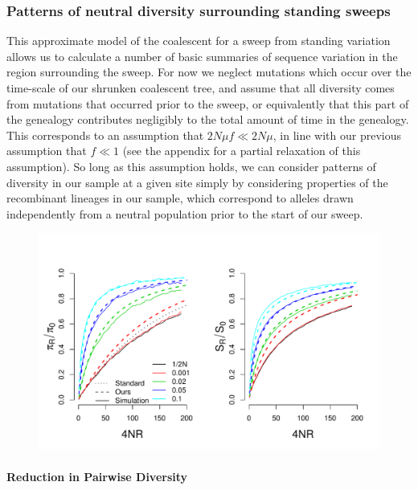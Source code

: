 \documentclass[a4paper,10pt]{article}
\begin{document}
\subsubsection*{Patterns of neutral diversity surrounding standing sweeps}
This approximate model of the coalescent for a sweep from standing variation allows us to calculate a number of basic summaries of sequence variation in the region surrounding the sweep. For now we neglect mutations which occur over the time-scale of our shrunken coalescent tree, and assume that all diversity comes from mutations that occurred prior to the sweep, or equivalently that this part of the genealogy contributes negligibly to the total amount of time in the genealogy. This corresponds to an assumption that $2N \mu f \ll 2N\mu$, in line with our previous assumption that $f \ll 1$ (see the appendix for a partial relaxation of this assumption). So long as this assumption holds, we can consider patterns of diversity in our sample at a given site simply by considering properties of the recombinant lineages in our sample, which correspond to alleles drawn independently from a neutral population prior to the start of our sweep.

\begin{figure}
	\includegraphics[width = \textwidth]{../Paper_Figures/pi_and_S_density.pdf} \label{pi_plot}
\end{figure}


\paragraph{Reduction in Pairwise Diversity}
\end{document}
